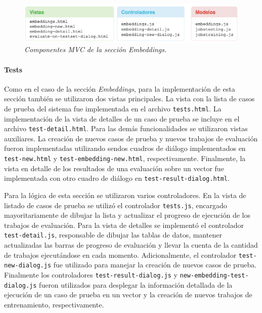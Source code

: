 \begin{figure}[h]
    \centering
    \includegraphics[width=\textwidth]{images/ui-nabu-mvc-embeddings}
    \caption{\textit{Componentes MVC de la sección Embeddings.}}
    \label{fig:ui-nabu-mvc-embeddings}
\end{figure}

\paragraph{Tests}

Como en el caso de la sección \textit{Embeddings}, para la implementación de esta sección también se
utilizaron dos vistas principales. La vista con la lista de casos de prueba del sistema fue implementada en
el archivo \texttt{tests.html}. La implementación de la vista de detalles de un caso de prueba se incluye
en el archivo \texttt{test-detail.html}. Para las demás funcionalidades se utilizaron vistas auxiliares. La
creación de nuevos casos de prueba y nuevos trabajos de evaluación fueron implementadas utilizando sendos
cuadros de diálogo implementados en \texttt{test-new.html} y \texttt{test-embedding-new.html},
respectivamente. Finalmente, la vista en detalle de los resultados de una evaluación sobre un vector fue
implementada con otro cuadro de diálogo en \texttt{test-result-dialog.html}.

Para la lógica de esta sección se utilizaron varios controladores. En la vista de listado de casos de
prueba se utilizó el controlador \texttt{tests.js}, encargado mayoritariamente de dibujar la lista y
actualizar el progreso de ejecución de los trabajos de evaluación. Para la vista de detalles se implementó
el controlador \texttt{test-detail.js}, responsable de dibujar las tablas de datos, mantener actualizadas
las barras de progreso de evaluación y llevar la cuenta de la cantidad de trabajos ejecutándose en cada
momento. Adicionalmente, el controlador \texttt{test-new-dialog.js} fue utilizado para manejar la creación
de nuevos casos de prueba. Finalmente los controladores \texttt{test-result-dialog.js} y
\texttt{new-embedding-test-dialog.js} fueron utilizados para desplegar la información detallada de la
ejecución de un caso de prueba en un vector y la creación de nuevos trabajos de entrenamiento,
respectivamente.

